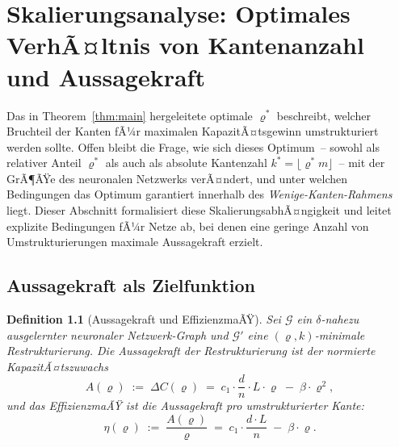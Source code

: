 ﻿\documentclass[12pt, a4paper, openany]{report}
\newtheorem{definition}[theorem]{Definition}
\newcommand{\calG}{\mathcal{G}}
\begin{document}
\chapter{Skalierungsanalyse: Optimales VerhÃ¤ltnis von Kantenanzahl und Aussagekraft}
\label{sec:scaling}

Das in Theorem~\ref{thm:main} hergeleitete optimale $\varrho^*$ beschreibt,
welcher Bruchteil der Kanten fÃ¼r maximalen KapazitÃ¤tsgewinn umstrukturiert
werden sollte.  Offen bleibt die Frage, wie sich dieses Optimum~-- sowohl
als relativer Anteil $\varrho^*$ als auch als absolute Kantenzahl
$k^* = \lfloor\varrho^* m\rfloor$~-- mit der GrÃ¶ÃŸe des neuronalen Netzwerks
verÃ¤ndert, und unter welchen Bedingungen das Optimum garantiert innerhalb des
\emph{Wenige-Kanten-Rahmens} liegt.  Dieser Abschnitt formalisiert diese
SkalierungsabhÃ¤ngigkeit und leitet explizite Bedingungen fÃ¼r Netze ab, bei
denen eine geringe Anzahl von Umstrukturierungen maximale Aussagekraft erzielt.

\section{Aussagekraft als Zielfunktion}
\label{sec:scaling_obj}

\begin{definition}[Aussagekraft und EffizienzmaÃŸ]
\label{def:aussagekraft}
Sei $\calG$ ein $\delta$-nahezu ausgelernter neuronaler Netzwerk-Graph und
$\calG'$ eine $(\varrho, k)$-minimale Restrukturierung.  Die
\emph{Aussagekraft} der Restrukturierung ist der normierte KapazitÃ¤tszuwachs
\[
  A(\varrho) \;:=\; \Delta C(\varrho)
  \;=\; c_1 \cdot \frac{d}{n} \cdot L \cdot \varrho \;-\; \beta \cdot \varrho^2,
\]
und das \emph{EffizienzmaÃŸ} ist die Aussagekraft pro umstrukturierter Kante:
\begin{equation}
  \label{eq:efficiency}
  \eta(\varrho)
  \;:=\; \frac{A(\varrho)}{\varrho}
  \;=\; c_1 \cdot \frac{d \cdot L}{n} \;-\; \beta \cdot \varrho.
\end{equation}
\end{definition}
\end{document}
